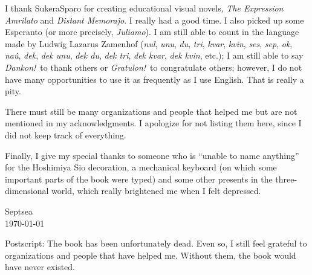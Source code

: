 I thank Sukera\-Sparo for creating educational visual novels,
\textit{The Expression Amrilato}\cite{%
    SukeraSparo:TheExpressionAmrilato}
and \textit{Distant Memora\^jo}\cite{%
    SukeraSparo:DistantMemorajxo}.
I really had a good time.
I also picked up some Esperanto
(or more precisely, \textit{Juliamo}).
I am still able to count in the language
made by Ludwig Lazarus Zamenhof
(\textit{nul}, \textit{unu}, \textit{du}, \textit{tri},
\textit{kvar}, \textit{kvin}, \textit{ses}, \textit{sep},
\textit{ok}, \textit{na\^u}, \textit{dek}, \textit{dek unu},
\textit{dek du}, \textit{dek tri},
\textit{dek kvar}, \textit{dek kvin},
etc.);
I am still able to say \textit{Dankon!}\ to thank others
or \textit{Gratulon!}\ to congratulate others;
however, I do not have many opportunities
to use it as frequently as I use English.
That is really a pity.

There must still be many organizations and people
that helped me but are not mentioned in my acknowledgments.
I apologize for not listing them here,
since I did not keep track of everything.

Finally, I give my special thanks to someone
who is ``unable to name anything''
for the Hoshimiya Sio decoration,
a mechanical keyboard
(on which some important parts of the book were typed)
and some other presents in the three-dimensional world,
which really brightened me when I felt depressed.

\begin{flushright}
    Septsea\\
    \today
\end{flushright}

\vspace{2ex}

Postscript:
The book has been unfortunately dead.
Even so, I still feel grateful to organizations and people
that have helped me.
Without them, the book would have never existed.
